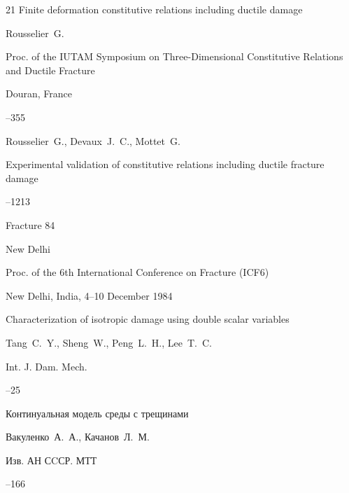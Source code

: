 \begin{thebibliography}{21}
\paper Finite deformation constitutive relations including ductile damage

\by Rousselier~G.

\inbook Proc. of the IUTAM Symposium on Three-Dimensional Constitutive Relations and Ductile Fracture

\publaddr Douran, France


--355




\by Rousselier~G., Devaux~J.~C., Mottet~G. 

\paper Experimental validation of constitutive relations including ductile fracture damage


--1213

\inbook Fracture 84 


\publaddr New Delhi

\volinfo Proc. of the 6th International Conference on Fracture (ICF6)

\procinfo New Delhi, India, 4–10 December 1984





\paper Characterization of isotropic damage using double scalar variables

\by Tang~C.~Y., Sheng~W., Peng~L.~H., Lee~T.~C.

\jour Int. J. Dam. Mech.





--25




\paper  Континуальная модель среды с трещинами

\by Вакуленко~А.~А., Качанов~Л.~М.

\jour Изв. АН СCСР. МТТ



--166




\end{thebibliography}
